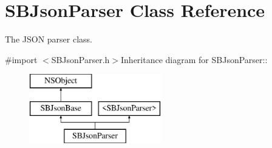 \hypertarget{interface_s_b_json_parser}{
\section{SBJsonParser Class Reference}
\label{interface_s_b_json_parser}
}


The JSON parser class.  


{\ttfamily \#import $<$SBJsonParser.h$>$}Inheritance diagram for SBJsonParser::\begin{figure}[H]
\begin{center}
\leavevmode
\includegraphics[height=3cm]{interface_s_b_json_parser}
\end{center}
\end{figure}
